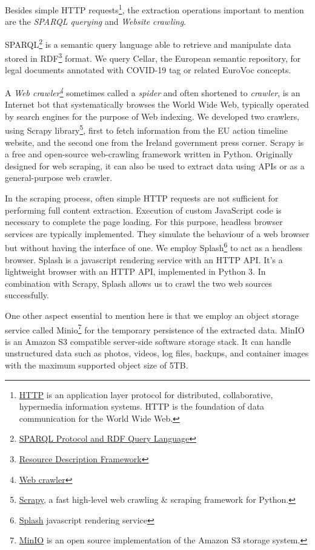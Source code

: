 Besides simple HTTP requests\footnote{ \href{https://en.wikipedia.org/wiki/Hypertext_Transfer_Protocol}{HTTP} is an application layer protocol for distributed, collaborative, hypermedia information systems. HTTP is the foundation of data communication for the World Wide Web. }, the extraction operations important to mention are the \textit{SPARQL querying} and \textit{Website crawling}. 

SPARQL\footnote{ \href{https://www.w3.org/TR/sparql11-query/}{SPARQL Protocol and RDF Query Language} } is a semantic query language able to retrieve and manipulate data stored in RDF\footnote{ \href{https://www.w3.org/TR/rdf11-concepts/}{Resource Description Framework}  } format. We query Cellar, the European semantic repository, for legal documents annotated with COVID-19 tag or related EuroVoc concepts. 

A \textit{Web crawler\footnote{ \href{https://en.wikipedia.org/wiki/Web_crawler}{Web crawler} }} sometimes called a \textit{spider} and often shortened to \textit{crawler}, is an Internet bot that systematically browses the World Wide Web, typically operated by search engines for the purpose of Web indexing. We developed two crawlers, using Scrapy library\footnote{ \href{https://en.wikipedia.org/wiki/Scrapy}{Scrapy}, a fast high-level web crawling $\&$  scraping framework for Python. }, first to fetch information from the EU action timeline website, and the second one from the Ireland government press corner. Scrapy is a free and open-source web-crawling framework written in Python. Originally designed for web scraping, it can also be used to extract data using APIs or as a general-purpose web crawler.

In the scraping process, often simple HTTP requests are not sufficient for performing full content extraction. Execution of custom JavaScript code is necessary to complete the page loading. For this purpose, headless browser services are typically implemented. They simulate the behaviour of a web browser but without having the interface of one. We employ Splash\footnote{ \href{https://splash.readthedocs.io/en/stable/}{Splash} javascript rendering service } to act as a headless browser. Splash is a javascript rendering service with an HTTP API. It's a lightweight browser with an HTTP API, implemented in Python 3. In combination with Scrapy, Splash allows us to crawl the two web sources successfully. 

One other aspect essential to mention here is that we employ an object storage service called Minio\footnote{ \href{https://min.io/}{MinIO} is an open source implementation of the Amazon S3 storage system.  } for the temporary persistence of the extracted data. MinIO is an Amazon S3 compatible server-side software storage stack. It can handle unstructured data such as photos, videos, log files, backups, and container images with the maximum supported object size of 5TB.

